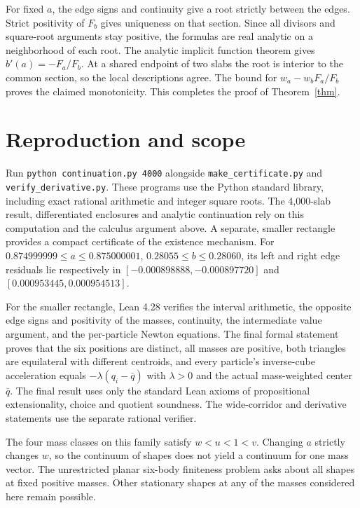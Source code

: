 \documentclass[10pt]{article}
\begin{document}
For fixed $a$, the edge signs and continuity give a root strictly between the edges. Strict positivity of $F_b$ gives uniqueness on that section. Since all divisors and square-root arguments stay positive, the formulas are real analytic on a neighborhood of each root. The analytic implicit function theorem gives $b'(a)=-F_a/F_b$. At a shared endpoint of two slabs the root is interior to the common section, so the local descriptions agree. The bound for $w_a-w_bF_a/F_b$ proves the claimed monotonicity. This completes the proof of Theorem~\ref{thm}.

\section{Reproduction and scope}
Run \texttt{python continuation.py 4000} alongside \texttt{make\_certificate.py} and \texttt{verify\_derivative.py}. These programs use the Python standard library, including exact rational arithmetic and integer square roots. The 4,000-slab result, differentiated enclosures and analytic continuation rely on this computation and the calculus argument above. A separate, smaller rectangle provides a compact certificate of the existence mechanism. For $0.874999999\le a\le0.875000001$, $0.28055\le b\le0.28060$, its left and right edge residuals lie respectively in $[-0.000898888,-0.000897720]$ and $[0.000953445,0.000954513]$.

For the smaller rectangle, Lean 4.28 verifies the interval arithmetic, the opposite edge signs and positivity of the masses, continuity, the intermediate value argument, and the per-particle Newton equations. The final formal statement proves that the six positions are distinct, all masses are positive, both triangles are equilateral with different centroids, and every particle's inverse-cube acceleration equals $-\lambda(q_i-\bar q)$ with $\lambda>0$ and the actual mass-weighted center $\bar q$. The final result uses only the standard Lean axioms of propositional extensionality, choice and quotient soundness. The wide-corridor and derivative statements use the separate rational verifier.

The four mass classes on this family satisfy $w<u<1<v$. Changing $a$ strictly changes $w$, so the continuum of shapes does not yield a continuum for one mass vector. The unrestricted planar six-body finiteness problem asks about all shapes at fixed positive masses. Other stationary shapes at any of the masses considered here remain possible.
\end{document}
